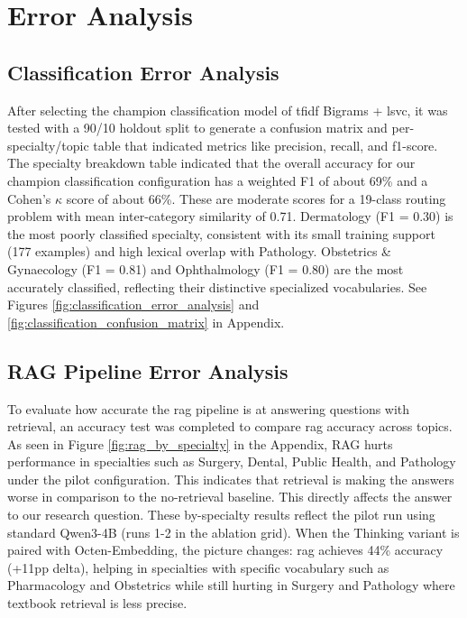 \chapter{Error Analysis}

\section{Classification Error Analysis}

After selecting the champion classification model of \gls{tfidf} Bigrams + \gls{lsvc}, it was tested with a 90/10 holdout split to generate a confusion matrix and per-specialty/topic table that indicated metrics like precision, recall, and f1-score. The specialty breakdown table indicated that the overall accuracy for our champion classification configuration has a weighted F1 of about 69\% and a Cohen's $\kappa$ score of about 66\%. These are moderate scores for a 19-class routing problem with mean inter-category similarity of 0.71. Dermatology (F1 = 0.30) is the most poorly classified specialty, consistent with its small training support (177 examples) and high lexical overlap with Pathology. Obstetrics \& Gynaecology (F1 = 0.81) and Ophthalmology (F1 = 0.80) are the most accurately classified, reflecting their distinctive specialized vocabularies. See Figures \ref{fig:classification_error_analysis} and \ref{fig:classification_confusion_matrix} in Appendix.

\section{RAG Pipeline Error Analysis}

To evaluate how accurate the \gls{rag} pipeline is at answering questions with retrieval, an accuracy test was completed to compare \gls{rag} accuracy across topics. As seen in Figure \ref{fig:rag_by_specialty} in the Appendix, RAG hurts performance in specialties such as Surgery, Dental, Public Health, and Pathology under the pilot configuration. This indicates that retrieval is making the answers worse in comparison to the no-retrieval baseline. This directly affects the answer to our research question. These by-specialty results reflect the pilot run using standard Qwen3-4B (runs 1-2 in the ablation grid). When the Thinking variant is paired with Octen-Embedding, the picture changes: \gls{rag} achieves 44\% accuracy (+11\gls{pp} delta), helping in specialties with specific vocabulary such as Pharmacology and Obstetrics while still hurting in Surgery and Pathology where textbook retrieval is less precise. 

